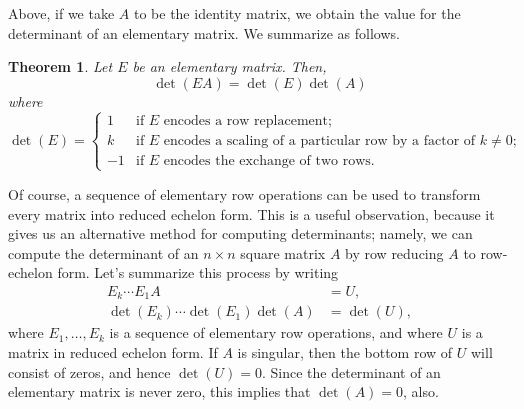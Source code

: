 \documentclass[12pt]{article}
\newtheorem{theorem}{Theorem}
\begin{document}
Above, if we take $A$ to be the identity matrix, we obtain the value
for the determinant of an elementary matrix.  We summarize as follows.\\
\begin{theorem} 
\label{thm:elemmat}
Let $E$ be an elementary matrix. Then,
  \[ \det(EA) = \det(E) \det(A)\] where
\[ \det(E) =
\begin{cases}
  1 & \text{if $E$ encodes a row replacement;} \\
  k & \text{if $E$ encodes a scaling of a particular row by a factor
    of $k\neq 0$;}\\
  -1 & \text{if $E$ encodes the exchange of two rows.}
\end{cases}\]
\end{theorem}

Of course, a sequence of elementary row operations can be used to
transform every matrix into reduced echelon form.  This is a useful
observation, because it gives us an alternative method for computing
determinants; namely, we can compute the determinant of an $n\times n$
square matrix $A$ by row reducing $A$ to row-echelon form.  Let's
summarize this process by writing
\begin{align*}
  E_k \cdots E_1 A &= U,\\
  \det(E_k) \cdots \det(E_1) \det(A) &= \det(U),
\end{align*}
where $E_1,\ldots, E_k$ is a sequence of elementary row operations, and
where $U$ is a matrix in reduced echelon form. If $A$ is singular,
then the bottom row of $U$ will
consist of zeros, and hence $\det(U) =0$.  Since the determinant of an
elementary matrix is never zero, this implies that $\det(A) = 0$,
also.
\end{document}
